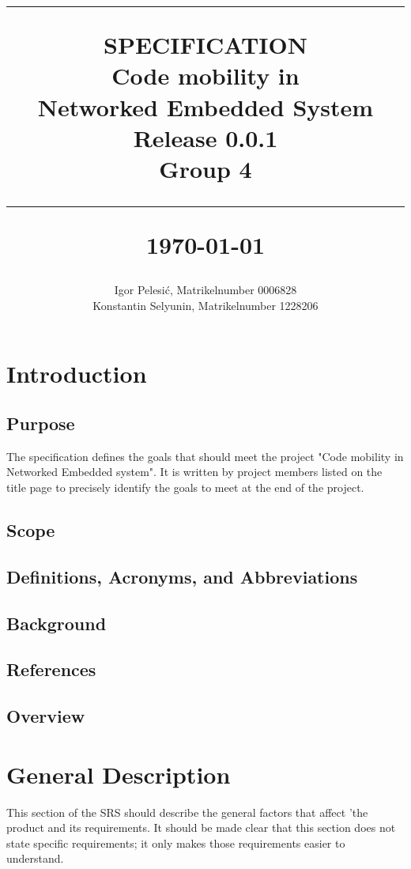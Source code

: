 \documentclass{scrreprt}
\title{%
\flushright
\rule{16cm}{2pt}\vskip1cm
\Huge{SPECIFICATION}\\
\vspace{1cm}
Code mobility in \\Networked Embedded System\\
\vspace{1cm}
\LARGE{Release 0.0.1\\}
\vspace{1cm}
Group 4\\
\vspace{1cm}
\author{Igor Pelesi\'c, Matrikelnumber 0006828\\
Konstantin Selyunin, Matrikelnumber 1228206}
\vfill
\rule{16cm}{2pt}\vskip1cm
\date{}
\today
}
\begin{document}
\maketitle
\tableofcontents
\renewcommand{\familydefault}{\sfdefault}

\chapter{Introduction}
\patchcmd{\chapter}{\if@openright\cleardoublepage\else\clearpage\fi}{}{}{}
	\section{Purpose}

The specification defines the goals that should meet the project "Code mobility in Networked Embedded system". It is written by project members listed on the title page to precisely identify the goals to meet at the end of the project.

	\section{Scope}

	\section{Definitions, Acronyms, and Abbreviations}

	\section{Background}

	\section{References}

	\section{Overview}

\chapter{General Description}

This section of the SRS should describe the general factors that affect 'the product and its requirements.  It should be made clear that this section does not state specific requirements; it only makes those requirements easier to understand.
\end{document}
